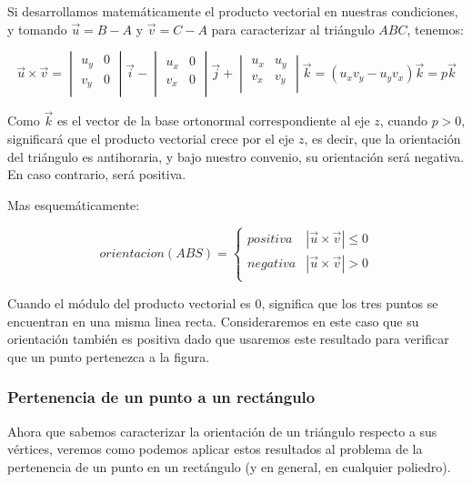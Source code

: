 Si desarrollamos matemáticamente el producto vectorial en nuestras
condiciones, y tomando $\vec{u} = B - A$ y $\vec{v} = C - A$ para caracterizar al
triángulo $ABC$, tenemos:

\[ \vec{u} \times \vec{v} = 
  \begin{vmatrix}u_y & 0 \\v_y & 0 \\\end{vmatrix} \vec{i}
  - \begin{vmatrix}u_x & 0 \\v_x & 0 \\\end{vmatrix} \vec{j}
  + \begin{vmatrix}u_x & u_y \\v_x & v_y \\\end{vmatrix} \vec{k}
 = (u_xv_y - u_yv_x)\vec{k} = p\vec{k} \]

Como $\vec{k}$ es el vector de la base ortonormal correspondiente al
eje $z$, cuando $p>0$, significará que el producto vectorial crece por
el eje $z$, es decir, que la orientación del triángulo es antihoraria,
y bajo nuestro convenio, su orientación será negativa. En caso
contrario, será positiva.

Mas esquemáticamente:

\[orientacion(ABS) = \left\{
  \begin{array}{lc}
    positiva & |\vec{u}\times\vec{v}| \leq 0\\
    negativa & |\vec{u}\times\vec{v}| > 0\\
\end{array} \right. \]

Cuando el módulo del producto vectorial es 0, significa que los tres
puntos se encuentran en una misma linea recta. Consideraremos en este
caso que su orientación también es positiva dado que usaremos este resultado para
verificar que un punto pertenezca a la figura.

\subsubsection{Pertenencia de un punto a un rectángulo}
Ahora que sabemos caracterizar la orientación de un triángulo respecto
a sus vértices, veremos como podemos aplicar estos resultados al
problema de la pertenencia de un punto en un rectángulo (y en general,
en cualquier poliedro).

